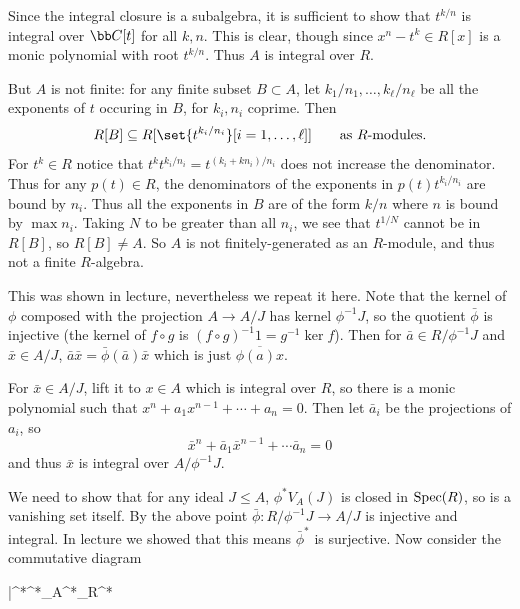 \eprob

\benum
    \item Since the integral closure is a subalgebra, it is sufficient to show that $t^{k/n}$ is integral over $\bC[t]$
    for all $k,n$.
    This is clear, though since $x^n-t^k\in R[x]$ is a monic polynomial with root $t^{k/n}$.
    Thus $A$ is integral over $R$.

    But $A$ is not finite: for any finite subset $B\subset A$, let $k_1/n_1,\dots,k_\ell/n_\ell$ be all the exponents
    of $t$ occuring in $B$, for $k_i,n_i$ coprime.
    Then
    $$ R[B] \subseteq R[\set{t^{k_i/n_i}}[i=1,\dots,\ell]] \qquad \hbox{as $R$-modules.} $$
    For $t^k\in R$ notice that $t^k t^{k_i/n_i}=t^{(k_i+kn_i)/n_i}$ does not increase the denominator.
    Thus for any $p(t)\in R$, the denominators of the exponents in $p(t)t^{k_i/n_i}$ are bound by $n_i$.
    Thus all the exponents in $B$ are of the form $k/n$ where $n$ is bound by $\max n_i$.
    Taking $N$ to be greater than all $n_i$, we see that $t^{1/N}$ cannot be in $R[B]$, so $R[B]\neq A$.
    So $A$ is not finitely-generated as an $R$-module, and thus not a finite $R$-algebra.

    \item This was shown in lecture, nevertheless we repeat it here.
    Note that the kernel of $\phi$ composed with the projection $A\to A/J$ has kernel $\phi^{-1}J$, so the quotient
    $\bar\phi$ is injective (the kernel of $f\circ g$ is $(f\circ g)^{-1}1=g^{-1}\ker f$).
    Then for $\bar a\in R/\phi^{-1}J$ and $\bar x\in A/J$, $\bar a\bar x=\bar\phi(\bar a)\bar x$ which is just
    $\overline{\phi(a)x}$.

    For $\bar x\in A/J$, lift it to $x\in A$ which is integral over $R$, so there is a monic polynomial such that
    $x^n+a_1x^{n-1}+\cdots+a_n=0$.
    Then let $\bar a_i$ be the projections of $a_i$, so
    $$ \bar x^n + \bar a_1\bar x^{n-1} + \cdots \bar a_n = 0 $$
    and thus $\bar x$ is integral over $A/\phi^{-1}J$.

    \item We need to show that for any ideal $J\leq A$, $\phi^*V_A(J)$ is closed in ${\rm Spec}(R)$, so is a vanishing
    set itself.
    By the above point $\bar\phi\colon R/\phi^{-1}J\to A/J$ is injective and integral.
    In lecture we showed that this means $\bar\phi^*$ is surjective.
    Now consider the commutative diagram

        {\bar\phi^*}{\phi^*}{\pi_A^*}{\pi_R^*}


